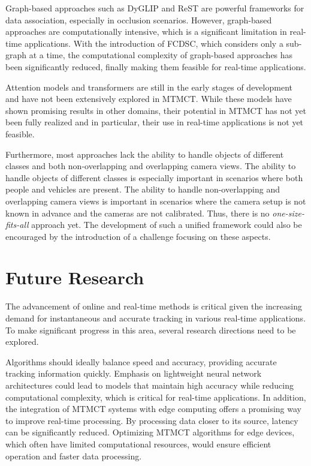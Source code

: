 Graph-based approaches such as DyGLIP and ReST are powerful frameworks for data association, especially in occlusion scenarios. However, graph-based approaches are computationally intensive, which is a significant limitation in real-time applications. With the introduction of FCDSC, which considers only a sub-graph at a time, the computational complexity of graph-based approaches has been significantly reduced, finally making them feasible for real-time applications.

Attention models and transformers are still in the early stages of development and have not been extensively explored in MTMCT. While these models have shown promising results in other domains, their potential in MTMCT has not yet been fully realized and in particular, their use in real-time applications is not yet feasible.

Furthermore, most approaches lack the ability to handle objects of different classes and both non-overlapping and overlapping camera views. The ability to handle objects of different classes is especially important in scenarios where both people and vehicles are present. The ability to handle non-overlapping and overlapping camera views is important in scenarios where the camera setup is not known in advance and the cameras are not calibrated. Thus, there is no \textit{one-size-fits-all} approach yet. The development of such a unified framework could also be encouraged by the introduction of a challenge focusing on these aspects.

\section{Future Research}\label{sec:future_research}
The advancement of online and real-time methods is critical given the increasing demand for instantaneous and accurate tracking in various real-time applications. To make significant progress in this area, several research directions need to be explored.

Algorithms should ideally balance speed and accuracy, providing accurate tracking information quickly. Emphasis on lightweight neural network architectures could lead to models that maintain high accuracy while reducing computational complexity, which is critical for real-time applications. In addition, the integration of MTMCT systems with edge computing offers a promising way to improve real-time processing. By processing data closer to its source, latency can be significantly reduced. Optimizing MTMCT algorithms for edge devices, which often have limited computational resources, would ensure efficient operation and faster data processing.

